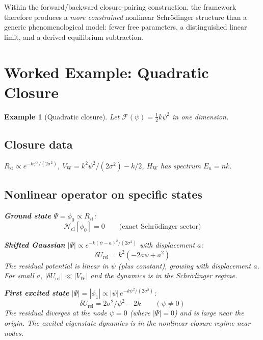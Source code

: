 \documentclass[12pt]{article}
\newtheorem{example}[theorem]{Example}
\newcommand{\Fcal}{\mathcal{F}}
\newcommand{\Ncl}{\mathcal{N}_{\mathrm{cl}}}
\newcommand{\VW}{V_{\mathrm{W}}}
\newcommand{\HW}{H_{\mathrm{W}}}
\newcommand{\Rst}{R_{\mathrm{st}}}
\newcommand{\dUrel}{\delta U_{\mathrm{rel}}}
\begin{document}
Within the forward/backward closure-pairing construction, the framework therefore produces a \textit{more constrained} nonlinear Schr\"odinger structure than a generic phenomenological model: fewer free parameters, a distinguished linear limit, and a derived equilibrium subtraction.

\section{Worked Example: Quadratic Closure}\label{sec:example}

\begin{example}[Quadratic closure]\label{ex:quadratic}
Let $\Fcal(\psi) = \frac{1}{2}k\psi^2$ in one dimension.

\subsection*{Closure data}

$\Rst \propto e^{-k\psi^2/(2\sigma^2)}$, $\VW = k^2\psi^2/(2\sigma^2) - k/2$, $\HW$ has spectrum $E_n = nk$.

\subsection*{Nonlinear operator on specific states}

\textbf{Ground state} $\Psi = \phi_0 \propto \Rst$:
\begin{equation}
    \Ncl[\phi_0] = 0 \qquad \text{(exact Schr\"odinger sector)}
\end{equation}

\textbf{Shifted Gaussian} $|\Psi| \propto e^{-k(\psi-a)^2/(2\sigma^2)}$ with displacement $a$:
\begin{equation}
    \dUrel = k^2(-2a\psi + a^2)
\end{equation}
The residual potential is linear in $\psi$ (plus constant), growing with displacement $a$. For small $a$, $|\dUrel| \ll |\VW|$ and the dynamics is in the Schr\"odinger regime.

\textbf{First excited state} $|\Psi| = |\phi_1| \propto |\psi|\,e^{-k\psi^2/(2\sigma^2)}$:
\begin{equation}
    \dUrel = 2\sigma^2/\psi^2 - 2k \qquad (\psi \neq 0)
\end{equation}
The residual diverges at the node $\psi = 0$ (where $|\Psi| = 0$) and is large near the origin. The excited eigenstate dynamics is in the nonlinear closure regime near nodes.


\end{example}
\end{document}
